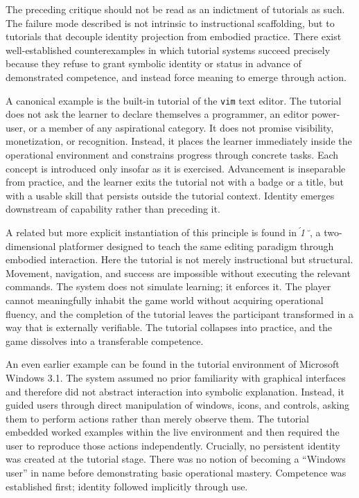\documentclass[11pt,oneside]{article}
\begin{document}
The preceding critique should not be read as an indictment of tutorials as such. The failure mode described is not intrinsic to instructional scaffolding, but to tutorials that decouple identity projection from embodied practice. There exist well-established counterexamples in which tutorial systems succeed precisely because they refuse to grant symbolic identity or status in advance of demonstrated competence, and instead force meaning to emerge through action.

A canonical example is the built-in tutorial of the \texttt{vim} text editor. The tutorial does not ask the learner to declare themselves a programmer, an editor power-user, or a member of any aspirational category. It does not promise visibility, monetization, or recognition. Instead, it places the learner immediately inside the operational environment and constrains progress through concrete tasks. Each concept is introduced only insofar as it is exercised. Advancement is inseparable from practice, and the learner exits the tutorial not with a badge or a title, but with a usable skill that persists outside the tutorial context. Identity emerges downstream of capability rather than preceding it.

A related but more explicit instantiation of this principle is found in \textit{1}, a two-dimensional platformer designed to teach the same editing paradigm through embodied interaction. Here the tutorial is not merely instructional but structural. Movement, navigation, and success are impossible without executing the relevant commands. The system does not simulate learning; it enforces it. The player cannot meaningfully inhabit the game world without acquiring operational fluency, and the completion of the tutorial leaves the participant transformed in a way that is externally verifiable. The tutorial collapses into practice, and the game dissolves into a transferable competence.

An even earlier example can be found in the tutorial environment of Microsoft Windows 3.1. The system assumed no prior familiarity with graphical interfaces and therefore did not abstract interaction into symbolic explanation. Instead, it guided users through direct manipulation of windows, icons, and controls, asking them to perform actions rather than merely observe them. The tutorial embedded worked examples within the live environment and then required the user to reproduce those actions independently. Crucially, no persistent identity was created at the tutorial stage. There was no notion of becoming a “Windows user” in name before demonstrating basic operational mastery. Competence was established first; identity followed implicitly through use.
\end{document}
